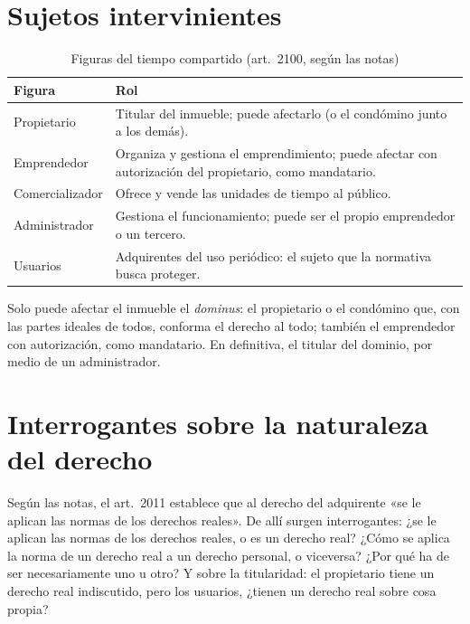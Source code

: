 \documentclass[12pt,oneside]{book}
\begin{document}
\section{Sujetos intervinientes}

\begin{table}[H]
\centering
\small
\begin{tabularx}{\textwidth}{>{\raggedright\arraybackslash}p{}>{\raggedright\arraybackslash}X}
\toprule
\textbf{Figura} & \textbf{Rol} \\
\midrule
Propietario & Titular del inmueble; puede afectarlo (o el condómino junto a los demás). \\
Emprendedor & Organiza y gestiona el emprendimiento; puede afectar con autorización del propietario, como mandatario. \\
Comercializador & Ofrece y vende las unidades de tiempo al público. \\
Administrador & Gestiona el funcionamiento; puede ser el propio emprendedor o un tercero. \\
Usuarios & Adquirentes del uso periódico: el sujeto que la normativa busca proteger. \\
\bottomrule
\end{tabularx}
\caption{Figuras del tiempo compartido (art.~2100, según las notas)}
\end{table}

Solo puede afectar el inmueble el \textit{dominus}: el propietario o el condómino que, con las partes ideales de todos, conforma el derecho al todo; también el emprendedor con autorización, como mandatario. En definitiva, el titular del dominio, por medio de un administrador.

\section{Interrogantes sobre la naturaleza del derecho}

Según las notas, el art.~2011 establece que al derecho del adquirente «se le aplican las normas de los derechos reales». %
De allí surgen interrogantes: ¿se le aplican las normas de los derechos reales, o es un derecho real? ¿Cómo se aplica la norma de un derecho real a un derecho personal, o viceversa? ¿Por qué ha de ser necesariamente uno u otro? Y sobre la titularidad: el propietario tiene un derecho real indiscutido, pero los usuarios, ¿tienen un derecho real sobre cosa propia?
\end{document}
